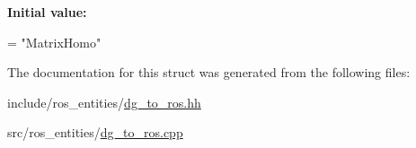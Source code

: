{\bfseries Initial value\+:}
\begin{DoxyCode}
=
    \textcolor{stringliteral}{"MatrixHomo"}
\end{DoxyCode}


The documentation for this struct was generated from the following files\+:\begin{DoxyCompactItemize}
\item 
include/ros\+\_\+entities/\hyperlink{dg__to__ros_8hh}{dg\+\_\+to\+\_\+ros.\+hh}\item 
src/ros\+\_\+entities/\hyperlink{dg__to__ros_8cpp}{dg\+\_\+to\+\_\+ros.\+cpp}\end{DoxyCompactItemize}
